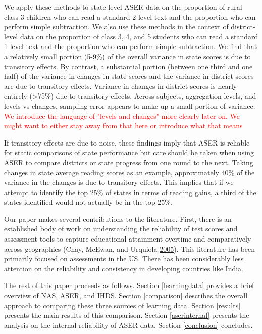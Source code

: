 \documentclass[
  11pt,
]{article}
\begin{document}
We apply these methods to state-level ASER data on the proportion of rural class 3 children who can read a standard 2 level text and the proportion who can perform simple subtraction. We also use these methods in the context of district-level data on the proportion of class 3, 4, and 5 students who can read a standard 1 level text and the proportion who can perform simple subtraction. We find that a relatively small portion (5-9\%) of the overall variance in state scores is due to transitory effects. By contrast, a substantial portion (between one third and one half) of the variance in changes in state scores and the variance in district scores are due to transitory effects. Variance in changes in district scores is nearly entirely (\textgreater75\%) due to transitory effects. Across subjects, aggregation levels, and levels vs changes, sampling error appears to make up a small portion of variance. \textcolor{red}{We introduce the language of "levels and changes" more clearly later on. We might want to either stay away from that here or introduce what that means}

If transitory effects are due to noise, these findings imply that ASER is reliable for static comparisons of state performance but care should be taken when using ASER to compare districts or state progress from one round to the next. Taking changes in state average reading scores as an example, approximately 40\% of the variance in the changes is due to transitory effects. This implies that if we attempt to identify the top 25\% of states in terms of reading gains, a third of the states identified would not actually be in the top 25\%.

Our paper makes several contributions to the literature. First, there is an established body of work on understanding the reliability of test scores and assessment tools to capture educational attainment overtime and comparatively across geographies (Chay, McEwan, and Urquiola \protect\hyperlink{ref-chay2005central}{2005}). This literature has been primarily focused on assessments in the US. There has been considerably less attention on the reliability and consistency in developing countries like India.

The rest of this paper proceeds as follows. Section \ref{learningdata} provides a brief overview of NAS, ASER, and IHDS. Section \ref{comparison} describes the overall approach to comparing these three sources of learning data. Section \ref{results} presents the main results of this comparison. Section \ref{aserinternal} presents the analysis on the internal reliability of ASER data. Section \ref{conclusion} concludes.
\end{document}
